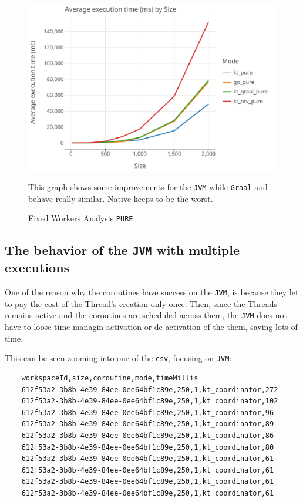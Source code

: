 \begin{figure}[H]
	\centering
	\begin{minipage}{0.7\textwidth}
		\centering
		\includegraphics[width=\textwidth]{img/graphs/fixed_workers_pure}
		\caption{Fixed Workers Analysis \texttt{PURE}}
	\end{minipage}\hfill
	\begin{minipage}{0.25\textwidth}
		This graph shows some improvements for the \texttt{JVM} while \texttt{Graal} and \Go behave really similar. \Kotlin Native keeps to be the worst.
	\end{minipage}
\end{figure}

\subsection{The behavior of the \texttt{JVM} with multiple executions}

One of the reason why the coroutines have success on the \texttt{JVM}, is because they let to pay the cost of the Thread's creation only once. Then, since the Threads remains active and the coroutines are scheduled across them, the \texttt{JVM} does not have to loose time managin activation or de-activation of the them, saving lots of time.

This can be seen zooming into one of the \texttt{csv}, focusing on \Kotlin \texttt{JVM}:

\begin{lstlisting}
	workspaceId,size,coroutine,mode,timeMillis
	612f53a2-3b8b-4e39-84ee-0ee64bf1c89e,250,1,kt_coordinator,272
	612f53a2-3b8b-4e39-84ee-0ee64bf1c89e,250,1,kt_coordinator,102
	612f53a2-3b8b-4e39-84ee-0ee64bf1c89e,250,1,kt_coordinator,96
	612f53a2-3b8b-4e39-84ee-0ee64bf1c89e,250,1,kt_coordinator,89
	612f53a2-3b8b-4e39-84ee-0ee64bf1c89e,250,1,kt_coordinator,86
	612f53a2-3b8b-4e39-84ee-0ee64bf1c89e,250,1,kt_coordinator,80
	612f53a2-3b8b-4e39-84ee-0ee64bf1c89e,250,1,kt_coordinator,61
	612f53a2-3b8b-4e39-84ee-0ee64bf1c89e,250,1,kt_coordinator,61
	612f53a2-3b8b-4e39-84ee-0ee64bf1c89e,250,1,kt_coordinator,61
	612f53a2-3b8b-4e39-84ee-0ee64bf1c89e,250,1,kt_coordinator,61
\end{lstlisting}

